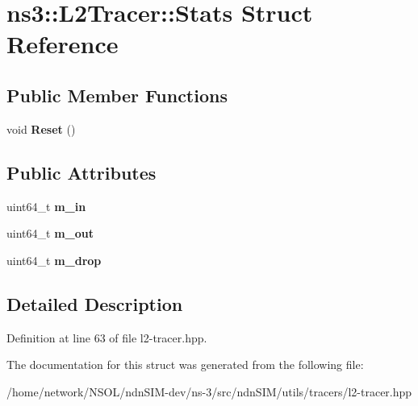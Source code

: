 \hypertarget{structns3_1_1L2Tracer_1_1Stats}{}\section{ns3\+:\+:L2\+Tracer\+:\+:Stats Struct Reference}
\label{structns3_1_1L2Tracer_1_1Stats}
\subsection*{Public Member Functions}
\begin{DoxyCompactItemize}
\item 
void {\bfseries Reset} ()\hypertarget{structns3_1_1L2Tracer_1_1Stats_ab3e71212100e6cd4e6125901b5c1379a}{}\label{structns3_1_1L2Tracer_1_1Stats_ab3e71212100e6cd4e6125901b5c1379a}

\end{DoxyCompactItemize}
\subsection*{Public Attributes}
\begin{DoxyCompactItemize}
\item 
uint64\+\_\+t {\bfseries m\+\_\+in}\hypertarget{structns3_1_1L2Tracer_1_1Stats_a7ff4d93dd52f2995534c6007c23c6452}{}\label{structns3_1_1L2Tracer_1_1Stats_a7ff4d93dd52f2995534c6007c23c6452}

\item 
uint64\+\_\+t {\bfseries m\+\_\+out}\hypertarget{structns3_1_1L2Tracer_1_1Stats_a93bb8a0d0eca5e31174493c81203ac27}{}\label{structns3_1_1L2Tracer_1_1Stats_a93bb8a0d0eca5e31174493c81203ac27}

\item 
uint64\+\_\+t {\bfseries m\+\_\+drop}\hypertarget{structns3_1_1L2Tracer_1_1Stats_a030b53aa33626092fed9bf09cf873a36}{}\label{structns3_1_1L2Tracer_1_1Stats_a030b53aa33626092fed9bf09cf873a36}

\end{DoxyCompactItemize}


\subsection{Detailed Description}


Definition at line 63 of file l2-\/tracer.\+hpp.



The documentation for this struct was generated from the following file\+:\begin{DoxyCompactItemize}
\item 
/home/network/\+N\+S\+O\+L/ndn\+S\+I\+M-\/dev/ns-\/3/src/ndn\+S\+I\+M/utils/tracers/l2-\/tracer.\+hpp\end{DoxyCompactItemize}
